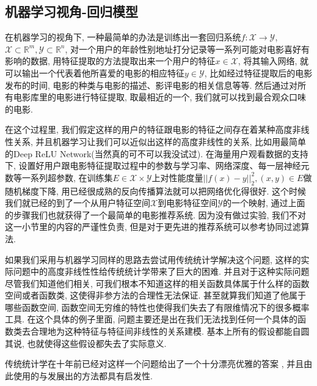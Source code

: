 \documentclass[lang=cn,11pt,a4paper]{elegantpaper}
\begin{document}
\subsection{机器学习视角-回归模型}
\par 在机器学习的视角下, 一种最简单的办法是训练出一套回归系统$f:\mathcal X \to \mathcal Y$, $\mathcal X \subset \mathbb R^m, \mathcal Y \subset \mathbb R^n$, 对一个用户的年龄性别地址打分记录等一系列可能对电影喜好有影响的数据, 用特征提取的方法提取出来一个用户的特征$x\in \mathcal X$, 将其输入网络, 就可以输出一个代表着他所喜爱的电影的相应特征$y\in \mathcal Y$, 比如经过特征提取后的电影发布的时间, 电影的种类与电影的描述、影评电影的相关信息等等. 然后通过对所有电影库里的电影进行特征提取, 取最相近的一个, 我们就可以找到最合观众口味的电影.
\par 在这个过程里, 我们假定这样的用户的特征跟电影的特征之间存在着某种高度非线性关系, 并且机器学习让我们可以近似出这样的高度非线性的关系, 比如用最简单的Deep ReLU Network(当然真的可不可以我没试过). 
在海量用户观看数据的支持下, 设置好用户跟电影特征提取过程中的参数与学习率、网络深度、每一层神经元数等一系列超参数, 在训练集$E\in \mathcal X \times \mathcal Y$上对性能度量$||f(x)-y||^2_2, (x,y)\in E$做随机梯度下降, 用已经很成熟的反向传播算法就可以把网络优化得很好. 这个时候我们就已经的到了一个从用户特征空间$\mathcal X$到电影特征空间$\mathcal Y$的一个映射, 通过上面的步骤我们也就获得了一个最简单的电影推荐系统. 因为没有做过实验, 我们不对这一小节里的内容的严谨性负责, 但是对于更先进的推荐系统可以参考协同过滤算法\cite{Goldberg1992}.
\par 如果我们采用与机器学习同样的思路去尝试用传统统计学解决这个问题, 这样的实际问题中的高度非线性性给传统统计学带来了巨大的困难. 并且对于这种实际问题尽管我们知道他们相关, 可我们根本不知道这样的相关函数具体属于什么样的函数空间或者函数类, 这使得非参方法的合理性无法保证. 甚至就算我们知道了他属于哪些函数空间, 函数空间无穷维的特性也使得我们失去了有限维情况下的很多概率工具. 在这个具体的例子里面, 问题主要还是出在我们无法找到任何一个具体的函数类去合理地为这种特征与特征间非线性的关系建模. 基本上所有的假设都能自圆其说, 也就使得这些假设都失去了实际意义.
\par 传统统计学在十年前已经对这样一个问题给出了一个十分漂亮优雅的答案\cite{Candes2010} , 并且由此使用的与发展出的方法都具有启发性. 
\end{document}
